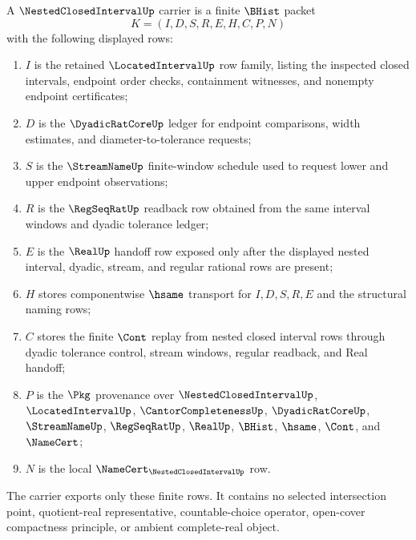 \begin{definition}
\label{def:nested-closed-interval-carrier}
A $\NestedClosedIntervalUp$ carrier is a finite $\BHist$ packet
$$
K=(I,D,S,R,E,H,C,P,N)
$$
with the following displayed rows:
\begin{enumerate}
\item $I$ is the retained $\LocatedIntervalUp$ row family, listing the inspected closed intervals, endpoint order checks, containment witnesses, and nonempty endpoint certificates;
\item $D$ is the $\DyadicRatCoreUp$ ledger for endpoint comparisons, width estimates, and diameter-to-tolerance requests;
\item $S$ is the $\StreamNameUp$ finite-window schedule used to request lower and upper endpoint observations;
\item $R$ is the $\RegSeqRatUp$ readback row obtained from the same interval windows and dyadic tolerance ledger;
\item $E$ is the $\RealUp$ handoff row exposed only after the displayed nested interval, dyadic, stream, and regular rational rows are present;
\item $H$ stores componentwise $\hsame$ transport for $I,D,S,R,E$ and the structural naming rows;
\item $C$ stores the finite $\Cont$ replay from nested closed interval rows through dyadic tolerance control, stream windows, regular readback, and Real handoff;
\item $P$ is the $\Pkg$ provenance over $\NestedClosedIntervalUp$, $\LocatedIntervalUp$, $\CantorCompletenessUp$, $\DyadicRatCoreUp$, $\StreamNameUp$, $\RegSeqRatUp$, $\RealUp$, $\BHist$, $\hsame$, $\Cont$, and $\NameCert$;
\item $N$ is the local $\NameCert_{\NestedClosedIntervalUp}$ row.
\end{enumerate}
The carrier exports only these finite rows. It contains no selected intersection point, quotient-real representative, countable-choice operator, open-cover compactness principle, or ambient complete-real object.
\end{definition}

